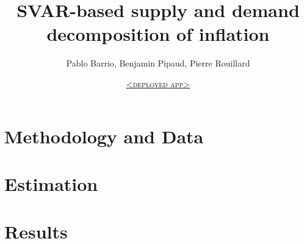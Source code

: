 \documentclass[letterpaper,12pt,leqno]{article}
\begin{document}
\title{SVAR-based supply and demand decomposition of inflation}
\author{Pablo Barrio, Benjamin Pipaud, Pierre Rouillard}
\date{\href{https://pierrerlld-svar3a-mainstreamlit-app-qy5le2.streamlit.app/}{\textsc{\underline{<deployed app>}}}}

\begin{titlepage}
\maketitle
\tableofcontents
\end{titlepage}

\section{Methodology and Data}\label{sec:sec1}

\section{Estimation}\label{sec:sec2}

\section{Results}\label{sec:sec3}

\end{document}
